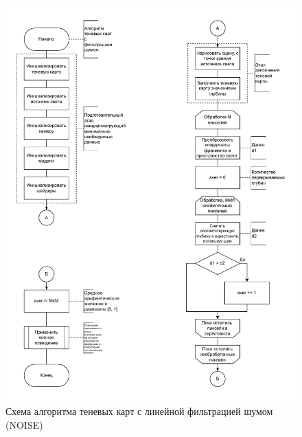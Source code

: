 \begin{figure}[h]
    \centering
    \includegraphics[width=\textwidth]{charts/shadow_map_noise.pdf}
    \caption{Схема алгоритма теневых карт с линейной фильтрацией шумом (NOISE)}
    \label{chart:shadow_map_noise}
\end{figure}
\FloatBarrier
